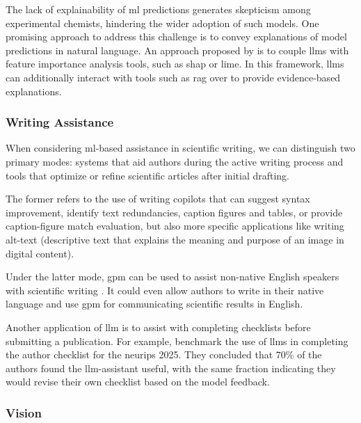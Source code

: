 The lack of explainability of \gls{ml} predictions generates skepticism among experimental chemists\autocite{wellawatte2025human}, hindering the wider adoption of such models.\autocite{wellawatte2022model}
One promising approach to address this challenge is to convey explanations of model predictions in natural language. 
An approach proposed by \textcite{wellawatte2025human} is to couple \glspl{llm} with feature importance analysis tools, such as \gls{shap} or \gls{lime}. 
In this framework, \glspl{llm} can additionally interact with tools such as \gls{rag} over  to provide evidence-based explanations.

\subsubsection{Writing Assistance} When considering \gls{ml}-based assistance in scientific writing, we can distinguish two primary modes: systems that aid authors during the active writing process and tools that optimize or refine scientific articles after initial drafting.

The former refers to the use of writing copilots that can suggest syntax improvement, identify text redundancies,\autocite{khalifa2024using} caption figures and tables\autocite{hsu2021scicap,selivanov2023medical}, or provide caption-figure match evaluation\autocite{hsu2023gpt04}, but also more specific applications like writing alt-text (descriptive text that explains the meaning and purpose of an image in digital content)\autocite{singh2024figura11y}. 

Under the latter mode, \gls{gpm} can be used to assist non-native English speakers with scientific writing \autocite{giglio2023use}.
It could even allow authors to write in their native language and use \gls{gpm} for communicating scientific results in English.

Another application of \gls{llm} is to assist with completing checklists before submitting a publication. For example, \textcite{goldberg2024usefulness} benchmark the use of \glspl{llm} in completing the author checklist for the \gls{neurips} 2025. They concluded that $70\%$ of the authors found the \gls{llm}-assistant useful, with the same fraction indicating they would revise their own checklist based on the model feedback.




\subsubsection{Vision} 

